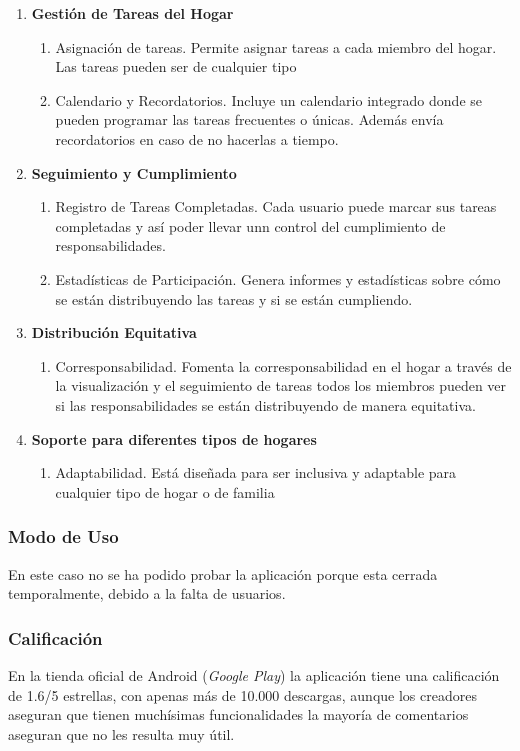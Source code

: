 \begin{enumerate}
    \item \textbf{Gestión de Tareas del Hogar}
    \begin{enumerate}
        \item Asignación de tareas. Permite asignar tareas a cada miembro del hogar. Las tareas pueden ser de cualquier tipo
        \item Calendario y Recordatorios. Incluye un calendario integrado donde se pueden programar las tareas frecuentes o únicas.
        Además envía recordatorios en caso de no hacerlas a tiempo.
    \end{enumerate}
    \item \textbf{Seguimiento y Cumplimiento}
    \begin{enumerate}
        \item Registro de Tareas Completadas. Cada usuario puede marcar sus tareas completadas y así poder llevar unn control del cumplimiento de responsabilidades.
        \item Estadísticas de Participación. Genera informes y estadísticas sobre cómo se están distribuyendo las tareas y si se están cumpliendo.
    \end{enumerate}
    \item \textbf{Distribución Equitativa}
    \begin{enumerate}
        \item Corresponsabilidad. Fomenta la corresponsabilidad en el hogar a través de la visualización 
        y el seguimiento de tareas todos los miembros pueden ver si las responsabilidades se están distribuyendo de manera equitativa.
    \end{enumerate}
    \item \textbf{Soporte para diferentes tipos de hogares}
    \begin{enumerate}
        \item Adaptabilidad. Está diseñada para ser inclusiva y adaptable para cualquier tipo de hogar o de familia
        \end{enumerate}
\end{enumerate}

\subsubsection{Modo de Uso}
\label{subsec:uso_metoca}
En este caso no se ha podido probar la aplicación porque esta cerrada temporalmente, debido a la falta de usuarios. 
\subsubsection{Calificación}
\label{subsec:calificacion_metoca}
En la tienda oficial de Android (\textit{Google Play}) la aplicación tiene una calificación de 1.6/5 estrellas,
con apenas más de 10.000 descargas, aunque los creadores aseguran que tienen muchísimas funcionalidades la mayoría de comentarios
aseguran que no les resulta muy útil.

